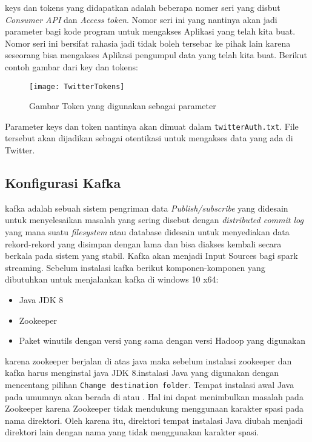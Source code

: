 keys dan tokens yang didapatkan adalah beberapa nomer seri yang disbut \textit{Consumer API} dan \textit{Access token}. Nomor seri ini yang nantinya akan jadi parameter bagi kode program untuk mengakses Aplikasi yang telah kita buat. Nomor seri ini bersifat rahasia jadi tidak boleh tersebar ke pihak lain karena seseorang bisa mengakses Aplikasi pengumpul data yang telah kita buat. Berikut contoh gambar dari key dan tokens:

\begin{figure}[H] 
	\centering  
	\texttt{[image: TwitterTokens]}  
	\caption[Gambar Twitter Tokens]{Gambar Token yang digunakan sebagai parameter} 
	\label{fig:Hadoop-home} 
\end{figure}

Parameter keys dan token nantinya akan dimuat dalam \texttt{twitterAuth.txt}. File tersebut akan dijadikan sebagai otentikasi untuk mengakses data yang ada di Twitter.
 
\subsection{Konfigurasi Kafka}
kafka adalah sebuah sistem pengriman data \textit{Publish/subscribe} yang didesain untuk menyelesaikan masalah yang sering disebut dengan \textit{distributed commit log} yang mana suatu \textit{filesystem} atau database didesain untuk menyediakan data rekord-rekord yang disimpan dengan lama dan bisa diakses kembali secara berkala pada sistem yang stabil. Kafka akan menjadi Input Sources bagi spark streaming. Sebelum instalasi kafka berikut komponen-komponen yang dibutuhkan untuk menjalankan kafka di windows 10 x64:


\begin{itemize}
	\item Java JDK 8
	\item Zookeeper
	\item Paket winutils dengan versi yang sama dengan versi Hadoop yang digunakan
\end{itemize}

karena zookeeper berjalan di atas java maka sebelum instalasi zookeeper dan kafka harus menginstal java JDK 8.instalasi Java yang digunakan dengan mencentang pilihan \texttt{Change destination folder}. Tempat instalasi awal Java pada umumnya akan berada di  atau . Hal ini dapat menimbulkan masalah pada Zookeeper karena Zookeeper tidak mendukung menggunaan karakter spasi pada nama direktori. Oleh karena itu, direktori tempat instalasi Java diubah menjadi direktori lain dengan nama yang tidak menggunakan karakter spasi.

